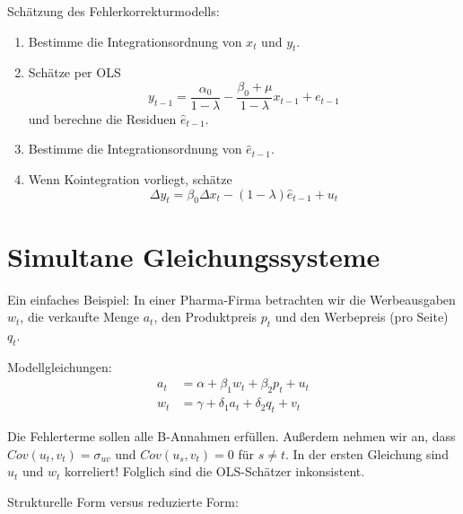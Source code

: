 \documentclass{article}
\begin{document}
Schätzung des Fehlerkorrekturmodells:
\begin{enumerate}
	\item Bestimme die Integrationsordnung von $x_{t}$ und $y_{t}$.
	\item Schätze per OLS
	\[ y_{t-1}=\frac{\alpha _{0}}{1-\lambda }-\frac{\beta _{0}+\mu }{1-\lambda }x_{t-1}+e_{t-1} \]
	und berechne die Residuen $\hat{e}_{t-1}$.
	\item Bestimme die Integrationsordnung von $\hat{e}_{t-1}$.
	\item Wenn Kointegration vorliegt, schätze
	\[ \Delta y_{t}=\beta _{0}\Delta x_{t}-\left( 1-\lambda \right) \hat{e}_{t-1}+u_{t} \]
\end{enumerate}

\section{Simultane Gleichungssysteme}

Ein einfaches Beispiel: In einer Pharma-Firma betrachten wir die 
Werbeausgaben $w_{t}$, die verkaufte Menge $a_{t}$, den Produktpreis $p_{t}$
und den Werbepreis (pro Seite) $q_{t}$.

Modellgleichungen:
\begin{align*}
a_{t} &=\alpha +\beta _{1}w_{t}+\beta _{2}p_{t}+u_{t} \\
w_{t} &=\gamma +\delta _{1}a_{t}+\delta _{2}q_{t}+v_{t}
\end{align*}

Die Fehlerterme sollen alle B-Annahmen erfüllen. Außerdem nehmen wir
an, dass $Cov(u_t,v_t) =\sigma _{uv}$ und $Cov(u_s,v_t)=0$ für $s\neq t$.
In der ersten Gleichung sind $u_{t}$ und $w_{t}$ korreliert!
Folglich sind die OLS-Schätzer inkonsistent.

Strukturelle Form versus reduzierte Form:
\end{document}
